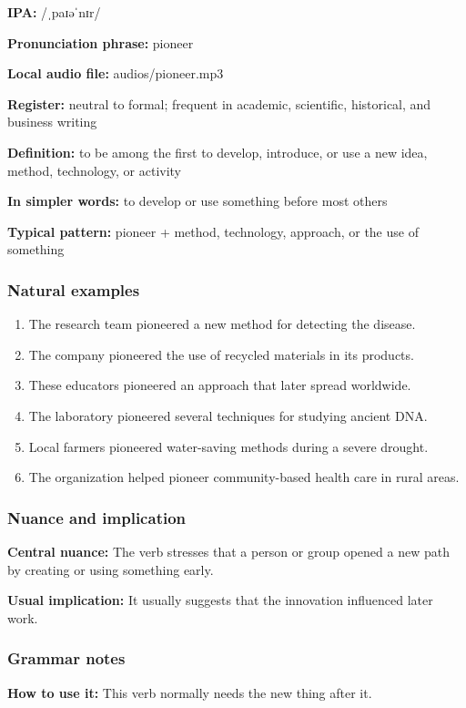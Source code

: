 \documentclass[11pt]{article}
\begin{document}
\textbf{IPA:} /ˌpaɪəˈnɪr/

\textbf{Pronunciation phrase:} pioneer

\textbf{Local audio file:} audios/pioneer.mp3

\textbf{Register:} neutral to formal; frequent in academic, scientific, historical, and business writing

\textbf{Definition:} to be among the first to develop, introduce, or use a new idea, method, technology, or activity

\textbf{In simpler words:} to develop or use something before most others

\textbf{Typical pattern:} pioneer + method, technology, approach, or the use of something

\subsubsection{Natural examples}
\begin{enumerate}
  \item The research team pioneered a new method for detecting the disease.
  \item The company pioneered the use of recycled materials in its products.
  \item These educators pioneered an approach that later spread worldwide.
  \item The laboratory pioneered several techniques for studying ancient DNA.
  \item Local farmers pioneered water-saving methods during a severe drought.
  \item The organization helped pioneer community-based health care in rural areas.
\end{enumerate}

\subsubsection{Nuance and implication}
\textbf{Central nuance:} The verb stresses that a person or group opened a new path by creating or using something early.

\textbf{Usual implication:} It usually suggests that the innovation influenced later work.

\subsubsection{Grammar notes}
\textbf{How to use it:} This verb normally needs the new thing after it.
\end{document}

